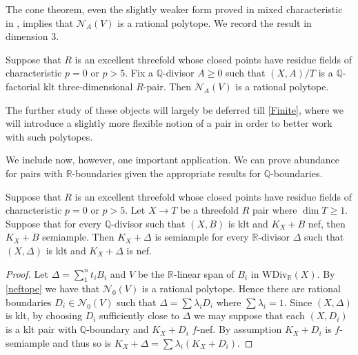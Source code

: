 The cone theorem, even the slightly weaker form proved in mixed characteristic in \cite{bhatt2020}, implies that $\mathcal{N}_{A}(V)$ is a rational polytope. We record the result in dimension $3$.

\begin{lemma}\label{neftope} \cite[Proposition 9.31]{bhatt2020}
	Suppose that $R$ is an excellent threefold whose closed points have residue fields of characteristic $p=0$ or $p > 5$.
	Fix a $\mathbb{Q}$-divisor $A \geq 0$ such that $(X,A)/T$ is a $\mathbb{Q}$-factorial klt three-dimensional $R$-pair.
	Then $\mathcal{N}_{A}(V)$ is a rational polytope.
\end{lemma}

The further study of these objects will largely be deferred till \autoref{Finite}, where we will introduce a slightly more flexible notion of a pair in order to better work with such polytopes.

We include now, however, one important application. We can prove abundance for pairs with $\mathbb{R}$-boundaries given the appropriate results for $\mathbb{Q}$-boundaries.

\begin{proposition}\label{QtoR}
	Suppose that $R$ is an excellent threefold whose closed points have residue fields of characteristic $p=0$ or $p > 5$.
	Let $X \to T$ be a threefold $R$ pair where $\dim T \geq 1$. Suppose that for every $\mathbb{Q}$-divisor such that $(X,B)$ is klt and $K_{X}+B$ nef, then $K_{X}+B$ semiample.
	Then $K_X+\Delta$ is semiample for every $\mathbb{R}$-divisor $\Delta$ such that $(X,\Delta)$ is klt and $K_X+\Delta$ is nef.
\end{proposition}
\begin{proof}
	Let $\Delta= \sum_{1}^{n} t_{i}B_{i}$ and $V$ be the $\mathbb{R}$-linear span of $B_i$ in $\text{WDiv}_\mathbb{R}(X)$. By \autoref{neftope} we have that $\mathcal{N}_{0}(V)$ is a rational polytope. Hence there are rational boundaries $D_{i} \in \mathcal{N}_{0}(V)$ such that $\Delta=\sum \lambda_{i} D_{i}$ where $\sum \lambda_{i} =1$. Since $(X,\Delta)$ is klt, by choosing $D_{i}$ sufficiently close to $\Delta$ we may suppose that each $(X,D_{i})$ is a klt pair with $\mathbb{Q}$-boundary and $K_X+D_i$ $f$-nef. 
	By assumption $K_{X}+D_{i}$ is $f$-semiample and thus so is $K_{X}+\Delta=\sum \lambda_{i} (K_{X}+D_{i})$.
\end{proof}

%
%
%



